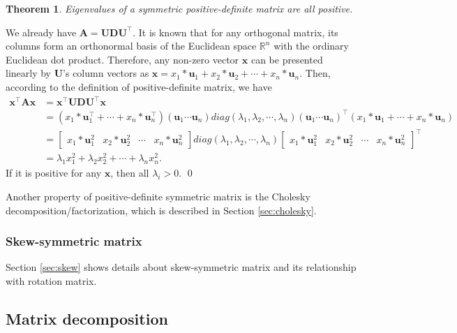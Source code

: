 \documentclass[12pt]{article}
\newtheorem{theorem}{Theorem}[section]
\numberwithin{equation}{section}
\renewenvironment{proof}{{\bfseries Proof.}}{\qed \\}
\begin{document}
\begin{theorem}
Eigenvalues of a symmetric positive-definite matrix are all positive.
\end{theorem}

\begin{proof}
We already have $\mathbf{A} = \mathbf{U}\mathbf{D}\mathbf{U}^\top$. It is known that for any orthogonal matrix, its columns form an orthonormal basis of the Euclidean space $\mathbb{R}^n$ with the ordinary Euclidean dot product. Therefore, any non-zero vector $\mathbf{x}$ can be presented linearly by $\mathbf{U}$'s column vectors as $\mathbf{x} = x_1*\mathbf{u}_1 + x_2*\mathbf{u}_2 + \cdots + x_n*\mathbf{u}_n$. Then, according to the definition of positive-definite matrix, we have
\begin{align*}
\mathbf{x}^\top \mathbf{A}\mathbf{x} & = \mathbf{x}^\top \mathbf{U}\mathbf{D}\mathbf{U}^\top \mathbf{x} \\
& = (x_1*\mathbf{u}_1^\top + \cdots + x_n*\mathbf{u}_n^\top)
(\mathbf{u}_1 \cdots \mathbf{u}_n)
diag(\lambda_1, \lambda_2, \cdots,\lambda_n)
(\mathbf{u}_1 \cdots \mathbf{u}_n)^\top
(x_1*\mathbf{u}_1 + \cdots + x_n*\mathbf{u}_n) \\
& =
\begin{bmatrix}
x_1*\mathbf{u}_1^2 & x_2*\mathbf{u}_2^2 & \cdots & x_n*\mathbf{u}_n^2
\end{bmatrix}
diag(\lambda_1, \lambda_2, \cdots,\lambda_n)
\begin{bmatrix}
x_1*\mathbf{u}_1^2 & x_2*\mathbf{u}_2^2 & \cdots & x_n*\mathbf{u}_n^2
\end{bmatrix} ^\top \\
&= \lambda_1 x_1^2 + \lambda_2 x_2^2 + \cdots + \lambda_n x_n^2.
\end{align*}
If it is positive for any $\mathbf{x}$, then all $\lambda_i > 0$.
\end{proof}

Another property of positive-definite symmetric matrix is the Cholesky decomposition/factorization, which is described in Section \ref{sec:cholesky}.

\subsubsection{Skew-symmetric matrix}

Section \ref{sec:skew} shows details about skew-symmetric matrix and its relationship with rotation matrix.

\subsection{Matrix decomposition}
\end{document}
